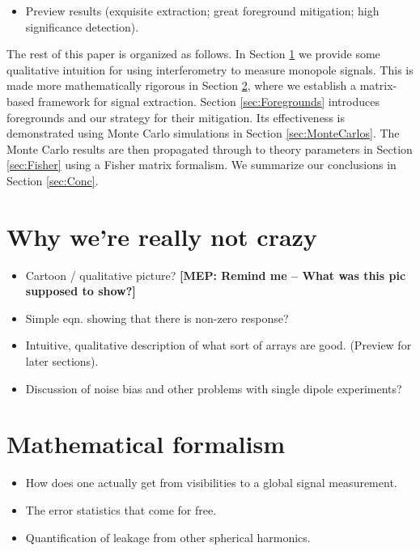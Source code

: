 \documentclass[twolcolumn,apj]{emulateapj}
\newcommand{\mep}[1]{{\color{applegreen} \textbf{[MEP:  #1]}}}
\begin{document}
\begin{itemize}
\item Preview results (exquisite extraction; great foreground mitigation; high significance detection).
\end{itemize}

The rest of this paper is organized as follows.  In Section \ref{sec:QualitativePic} we provide some qualitative intuition for using interferometry to measure monopole signals.  This is made more mathematically rigorous in Section \ref{sec:MathForm}, where we establish a matrix-based framework for signal extraction.  Section \ref{sec:Foregrounds} introduces foregrounds and our strategy for their mitigation.  Its effectiveness is demonstrated using Monte Carlo simulations in Section \ref{sec:MonteCarlos}.  The Monte Carlo results are then propagated through to theory parameters in Section \ref{sec:Fisher} using a Fisher matrix formalism.  We summarize our conclusions in Section \ref{sec:Conc}.

\section{Why we're really not crazy}
\label{sec:QualitativePic}
\begin{itemize}
\item Cartoon / qualitative picture? \mep{Remind me -- What was this pic supposed to show?}
\item Simple eqn. showing that there is non-zero response?
\item Intuitive, qualitative description of what sort of arrays are good.  (Preview for later sections).
\item Discussion of noise bias and other problems with single dipole experiments?
\end{itemize}

\section{Mathematical formalism}
\label{sec:MathForm}
\begin{itemize}
\item How does one actually get from visibilities to a global signal measurement.
\item The error statistics that come for free.
\item Quantification of leakage from other spherical harmonics.
\end{itemize}
\end{document}
